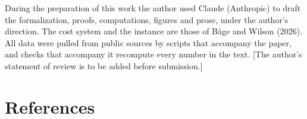 \documentclass[12pt]{article}
\theoremstyle{plain}
\begin{document}
During the preparation of this work the author used Claude (Anthropic) to draft the formalization, proofs, computations, figures and prose, under the author's direction. The cost system and the instance are those of B\r{a}ge and Wilson (2026). All data were pulled from public sources by scripts that accompany the paper, and checks that accompany it recompute every number in the text. [The author's statement of review is to be added before submission.]

\section*{References}

\end{document}
